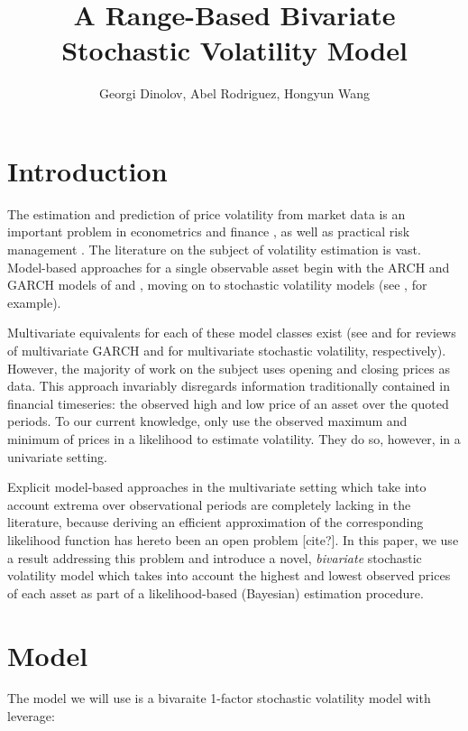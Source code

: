 \documentclass[10pt]{article}
\title{A Range-Based Bivariate Stochastic Volatility Model}
\author{Georgi Dinolov, Abel Rodriguez, Hongyun Wang}
\date{} %
\begin{document}
\def\spacingset#1{\renewcommand{\baselinestretch}%
{#1}\small\normalsize} \spacingset{1}

\bigskip

\vspace{1cm}
\noindent

\spacingset{1.00} %
\section{Introduction}

The estimation and prediction of price volatility from market data is
an important problem in econometrics and finance
\citep{abramov2007estimation}, as well as practical risk management
\citep{brandt2006dynamic}. The literature on the subject of volatility
estimation is vast. Model-based approaches for a single observable
asset begin with the ARCH and GARCH models of \cite{engle1982} and
\cite{bollerslev1986}, moving on to stochastic volatility models (see
\cite{shephard2005selected-readings}, for example).

Multivariate equivalents for each of these model classes exist (see
\cite{bauwens2006multivariate} and \cite{asai2006multivariate} for
reviews of multivariate GARCH and for multivariate stochastic
volatility, respectively). However, the majority of work on the
subject uses opening and closing prices as data. This approach
invariably disregards information traditionally contained in financial
timeseries: the observed high and low price of an asset over the
quoted periods. To our current knowledge, only \cite{rodriguez2012}
use the observed maximum and minimum of prices in a likelihood to
estimate volatility. They do so, however, in a univariate
setting.

Explicit model-based approaches in the multivariate setting which take
into account extrema over observational periods are completely lacking
in the literature, because deriving an efficient approximation of the
corresponding likelihood function has hereto been an open problem
[cite?]. In this paper, we use a result addressing this problem and
introduce a novel, \textit{bivariate} stochastic volatility model
which takes into account the highest and lowest observed prices of
each asset as part of a likelihood-based (Bayesian) estimation
procedure.

\section{Model}
The model we will use is a bivaraite 1-factor stochastic volatility
model with leverage:
\end{document}
